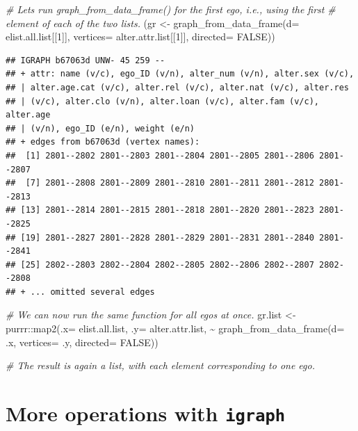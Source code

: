 \documentclass[
]{book}
\newenvironment{Shaded}{\begin{snugshade}}{\end{snugshade}}
\newcommand{\AttributeTok}[1]{\textcolor[rgb]{0.77,0.63,0.00}{#1}}
\newcommand{\CommentTok}[1]{\textcolor[rgb]{0.56,0.35,0.01}{\textit{#1}}}
\newcommand{\ConstantTok}[1]{\textcolor[rgb]{0.00,0.00,0.00}{#1}}
\newcommand{\DecValTok}[1]{\textcolor[rgb]{0.00,0.00,0.81}{#1}}
\newcommand{\FunctionTok}[1]{\textcolor[rgb]{0.00,0.00,0.00}{#1}}
\newcommand{\NormalTok}[1]{#1}
\newcommand{\OtherTok}[1]{\textcolor[rgb]{0.56,0.35,0.01}{#1}}
\newcommand{\SpecialCharTok}[1]{\textcolor[rgb]{0.00,0.00,0.00}{#1}}
\begin{document}
\begin{Shaded}
\begin{Highlighting}[]
\CommentTok{\# Let\textquotesingle{}s run graph\_from\_data\_frame() for the first ego, i.e., using the first}
\CommentTok{\# element of each of the two lists.}
\NormalTok{(gr }\OtherTok{\textless{}{-}} \FunctionTok{graph\_from\_data\_frame}\NormalTok{(}\AttributeTok{d=}\NormalTok{ elist.all.list[[}\DecValTok{1}\NormalTok{]], }
                             \AttributeTok{vertices=}\NormalTok{ alter.attr.list[[}\DecValTok{1}\NormalTok{]], }\AttributeTok{directed=} \ConstantTok{FALSE}\NormalTok{))}
\end{Highlighting}
\end{Shaded}

\begin{verbatim}
## IGRAPH b67063d UNW- 45 259 -- 
## + attr: name (v/c), ego_ID (v/n), alter_num (v/n), alter.sex (v/c),
## | alter.age.cat (v/c), alter.rel (v/c), alter.nat (v/c), alter.res
## | (v/c), alter.clo (v/n), alter.loan (v/c), alter.fam (v/c), alter.age
## | (v/n), ego_ID (e/n), weight (e/n)
## + edges from b67063d (vertex names):
##  [1] 2801--2802 2801--2803 2801--2804 2801--2805 2801--2806 2801--2807
##  [7] 2801--2808 2801--2809 2801--2810 2801--2811 2801--2812 2801--2813
## [13] 2801--2814 2801--2815 2801--2818 2801--2820 2801--2823 2801--2825
## [19] 2801--2827 2801--2828 2801--2829 2801--2831 2801--2840 2801--2841
## [25] 2802--2803 2802--2804 2802--2805 2802--2806 2802--2807 2802--2808
## + ... omitted several edges
\end{verbatim}

\begin{Shaded}
\begin{Highlighting}[]
\CommentTok{\# We can now run the same function for all egos at once.}
\NormalTok{gr.list }\OtherTok{\textless{}{-}}\NormalTok{ purrr}\SpecialCharTok{::}\FunctionTok{map2}\NormalTok{(}\AttributeTok{.x=}\NormalTok{ elist.all.list, }\AttributeTok{.y=}\NormalTok{ alter.attr.list, }
                       \SpecialCharTok{\textasciitilde{}} \FunctionTok{graph\_from\_data\_frame}\NormalTok{(}\AttributeTok{d=}\NormalTok{ .x, }\AttributeTok{vertices=}\NormalTok{ .y, }\AttributeTok{directed=} \ConstantTok{FALSE}\NormalTok{))}

\CommentTok{\# The result is again a list, with each element corresponding to one ego.}
\end{Highlighting}
\end{Shaded}

\hypertarget{more-igraph}{%
\section{\texorpdfstring{More operations with \texttt{igraph}}{More operations with igraph}}\label{more-igraph}}
\end{document}
